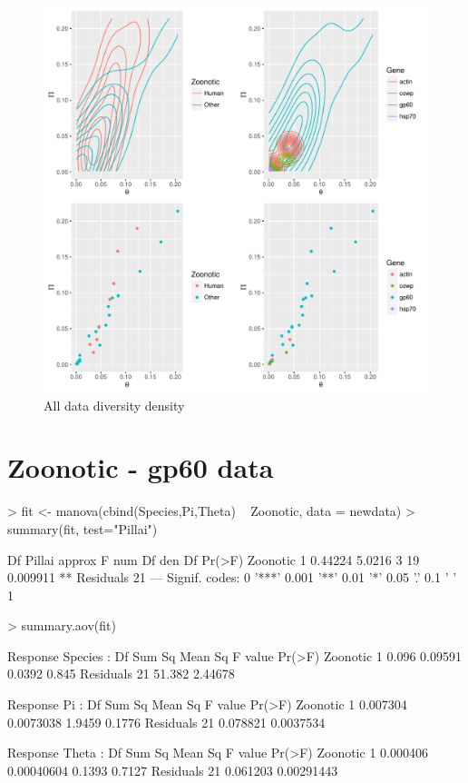 \documentclass{article}
\begin{document}
\begin{figure}
\includegraphics{Fig-test4}
\caption{All data diversity density}
\label{fig:x}
\end{figure}

\section{Zoonotic - gp60 data}

  
\begin{Schunk}
\begin{Sinput}
> fit <- manova(cbind(Species,Pi,Theta) ~ Zoonotic, data = newdata)
> summary(fit, test="Pillai")
\end{Sinput}
\begin{Soutput}
          Df  Pillai approx F num Df den Df   Pr(>F)   
Zoonotic   1 0.44224   5.0216      3     19 0.009911 **
Residuals 21                                           
---
Signif. codes:  0 '***' 0.001 '**' 0.01 '*' 0.05 '.' 0.1 ' ' 1
\end{Soutput}
\begin{Sinput}
> summary.aov(fit)
\end{Sinput}
\begin{Soutput}
 Response Species :
            Df Sum Sq Mean Sq F value Pr(>F)
Zoonotic     1  0.096 0.09591  0.0392  0.845
Residuals   21 51.382 2.44678               

 Response Pi :
            Df   Sum Sq   Mean Sq F value Pr(>F)
Zoonotic     1 0.007304 0.0073038  1.9459 0.1776
Residuals   21 0.078821 0.0037534               

 Response Theta :
            Df   Sum Sq    Mean Sq F value Pr(>F)
Zoonotic     1 0.000406 0.00040604  0.1393 0.7127
Residuals   21 0.061203 0.00291443               
\end{Soutput}
\end{Schunk}
\end{document}
